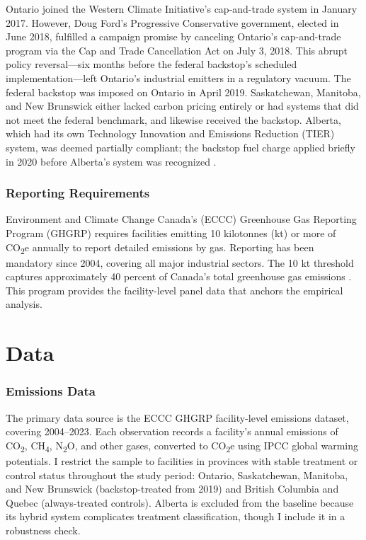 \documentclass[12pt]{article}
\begin{document}
Ontario joined the Western Climate Initiative's cap-and-trade system in January 2017. However, Doug Ford's Progressive Conservative government, elected in June 2018, fulfilled a campaign promise by canceling Ontario's cap-and-trade program via the Cap and Trade Cancellation Act on July 3, 2018. This abrupt policy reversal---six months before the federal backstop's scheduled implementation---left Ontario's industrial emitters in a regulatory vacuum. The federal backstop was imposed on Ontario in April 2019. Saskatchewan, Manitoba, and New Brunswick either lacked carbon pricing entirely or had systems that did not meet the federal benchmark, and likewise received the backstop. Alberta, which had its own Technology Innovation and Emissions Reduction (TIER) system, was deemed partially compliant; the backstop fuel charge applied briefly in 2020 before Alberta's system was recognized \citep{Leach2012}.

\subsubsection*{Reporting Requirements} Environment and Climate Change Canada's (ECCC) Greenhouse Gas Reporting Program (GHGRP) requires facilities emitting 10 kilotonnes (kt) or more of CO\textsubscript{2}e annually to report detailed emissions by gas. Reporting has been mandatory since 2004, covering all major industrial sectors. The 10 kt threshold captures approximately 40 percent of Canada's total greenhouse gas emissions \citep{ECCC2023}. This program provides the facility-level panel data that anchors the empirical analysis.


\section{Data}
\label{sec:data}

\subsubsection*{Emissions Data} The primary data source is the ECCC GHGRP facility-level emissions dataset, covering 2004--2023. Each observation records a facility's annual emissions of CO\textsubscript{2}, CH\textsubscript{4}, N\textsubscript{2}O, and other gases, converted to CO\textsubscript{2}e using IPCC global warming potentials. I restrict the sample to facilities in provinces with stable treatment or control status throughout the study period: Ontario, Saskatchewan, Manitoba, and New Brunswick (backstop-treated from 2019) and British Columbia and Quebec (always-treated controls). Alberta is excluded from the baseline because its hybrid system complicates treatment classification, though I include it in a robustness check.
\end{document}
